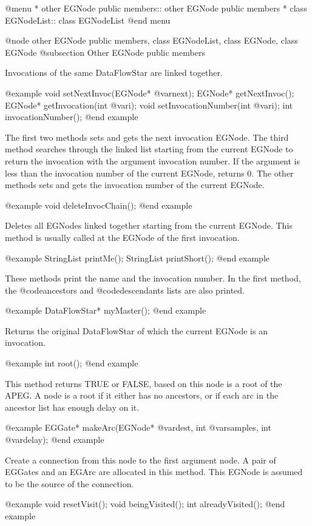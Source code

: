 @menu
* other EGNode public members::		other EGNode public members
* class EGNodeList::			class EGNodeList
@end menu

@node other EGNode public members, class EGNodeList, class EGNode, class EGNode
@subsection Other EGNode public members

Invocations of the same DataFlowStar are linked together.

@example
void setNextInvoc(EGNode* @var{next});
EGNode* getNextInvoc();
EGNode* getInvocation(int @var{i});
void setInvocationNumber(int @var{i});
int invocationNumber();
@end example

The first two methods sets and gets the next invocation EGNode. The third
method searches through the linked list starting from the current EGNode
to return the invocation with the argument invocation number. If the
argument is less than the invocation number of the current EGNode, returns 0.
The other methods sets and gets the invocation number of the current EGNode.

@example
void deleteInvocChain();
@end example

Deletes all EGNodes linked together starting from the current EGNode.
This method is usually called at the EGNode of the first invocation. 

@example
StringList printMe();
StringList printShort();
@end example

These methods print the name and the invocation number. In the first method,
the @code{ancestors} and @code{descendants} lists are also printed.

@example
DataFlowStar* myMaster();
@end example

Returns the original DataFlowStar of which the current EGNode is an
invocation.

@example 
int root();
@end example

This method returns TRUE or FALSE, based on this node is a root of the
APEG. A node is a root if it either has no ancestors, or if each arc
in the ancestor list has enough delay on it.

@example
EGGate* makeArc(EGNode* @var{dest}, int @var{samples}, int @var{delay});
@end example

Create a connection from this node to the first argument node. A pair of
EGGates and an EGArc are allocated in this method. This EGNode
is assumed to be the source of the connection. 

@example
void resetVisit();
void beingVisited();
int alreadyVisited();
@end example

